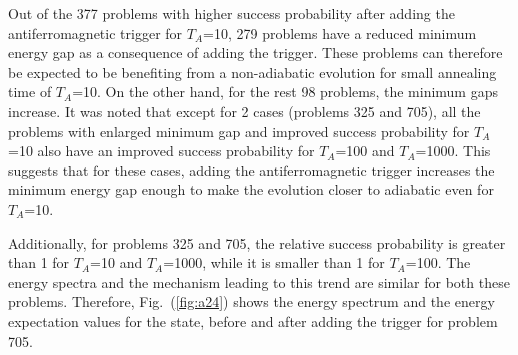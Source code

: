 \documentclass[../main.tex]{subfiles}
\begin{document}
Out of the 377 problems with higher success probability after adding the antiferromagnetic trigger for $T_A$=10, 279 problems have a reduced minimum energy gap as a consequence of adding the trigger. These problems can therefore be expected to be benefiting from a non-adiabatic evolution for small annealing time of $T_A$=10. On the other hand, for the rest 98 problems, the minimum gaps increase. It was noted that except for 2 cases (problems 325 and 705), all the problems with enlarged minimum gap and improved success probability for $T_A$=10 also have an improved success probability for $T_A$=100 and $T_A$=1000. This suggests that for these cases, adding the antiferromagnetic trigger increases the minimum energy gap enough to make the evolution closer to adiabatic even for $T_A$=10. 
\newpage

Additionally, for problems 325 and 705, the relative success probability is greater than 1 for $T_A$=10 and $T_A$=1000, while it is smaller than 1 for $T_A$=100. The energy spectra and the mechanism leading to this trend are similar for both these problems. Therefore, Fig.~(\ref{fig:a24}) shows the energy spectrum and the energy expectation values for the state, before and after adding the trigger for problem 705.
\end{document}
